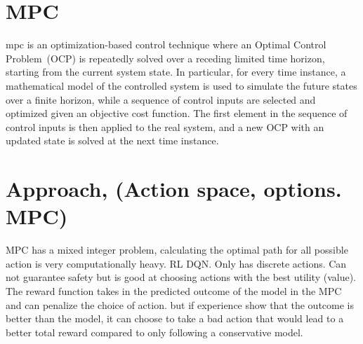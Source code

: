  
\section{MPC}
\gls{mpc} is an optimization-based control technique where an Optimal Control Problem~(OCP) is repeatedly solved over a receding limited time horizon, starting from the current system state. In particular, for every time instance, a mathematical model of the controlled system is used to simulate the future states over a finite horizon, while a sequence of control inputs are selected and optimized given an objective cost function. The first element in the sequence of control inputs is then applied to the real system, and a new OCP with an updated state is solved at the next time instance.

\section{Approach, (Action space, options. MPC)}

MPC has a mixed integer problem, calculating the optimal path for all possible action is very computationally heavy. 
RL DQN. Only has discrete actions. Can not guarantee safety but is good at choosing actions with the best utility (value). 
The reward function takes in the predicted outcome of the model in the MPC and can penalize the choice of action. but if experience show that the outcome is better than the model, it can choose to take a bad action that would lead to a better total reward compared to only following a conservative model. 

